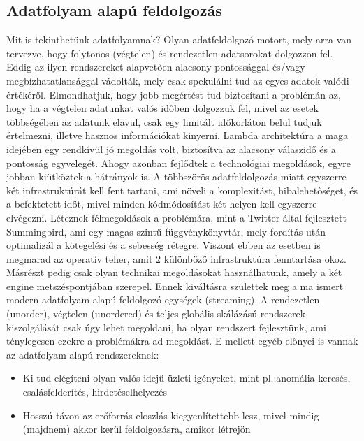 \documentclass[a4paper,12pt]{article}
\begin{document}
\subsection{Adatfolyam alapú feldolgozás}
Mit is tekinthetünk adatfolyamnak? Olyan adatfeldolgozó motort, mely arra van tervezve, hogy folytonos (végtelen) és rendezetlen adatsorokat dolgozzon fel\cite{tyler}. Eddig az ilyen rendszereket alapvetően alacsony pontossággal és/vagy megbízhatatlansággal vádolták, mely csak spekulálni tud az egyes adatok valódi értékéről. Elmondhatjuk, hogy jobb megértést tud biztosítani a problémán az, hogy ha a végtelen adatunkat valós időben dolgozzuk fel, mivel az esetek többségében az adatunk elavul, csak egy limitált időkorláton belül tudjuk értelmezni, illetve hasznos információkat kinyerni. \newline
Lambda architektúra a maga idejében egy rendkívül jó megoldás volt, biztosítva az alacsony válaszidő és a pontosság egyvelegét. Ahogy azonban fejlődtek a technológiai megoldások, egyre jobban kiütköztek a hátrányok is. A többszörös adatfeldolgozás miatt egyszerre két infrastruktúrát kell fent tartani, ami növeli a komplexitást, hibalehetőséget, és a befektetett időt, mivel minden kódmódosítást két helyen kell egyszerre elvégezni. Léteznek félmegoldások a problémára, mint a Twitter által fejlesztett Summingbird\cite{summingbird}, ami egy magas szintű függvénykönyvtár, mely fordítás után optimalizál a kötegelési és a sebesség rétegre. Viszont ebben az esetben is megmarad az operatív teher, amit 2 különböző infrastruktúra fenntartása okoz. Másrészt pedig csak olyan technikai megoldásokat használhatunk, amely a két engine metszéspontjában szerepel. \newline
Ennek kiváltásra születtek meg a ma ismert modern adatfolyam alapú feldolgozó egységek (streaming). A rendezetlen (unorder), végtelen (unordered) és teljes globális skálázású rendszerek kiszolgálását csak úgy lehet megoldani, ha olyan rendszert fejlesztünk, ami ténylegesen ezekre a problémákra ad megoldást.\cite{tyler} E mellett egyéb előnyei is vannak az adatfolyam alapú rendszereknek: 
\begin{itemize}
\item Ki tud elégíteni olyan valós idejű üzleti igényeket, mint pl.:anomália keresés, csalásfelderítés, hirdetéselhelyezés
\item Hosszú távon az erőforrás eloszlás kiegyenlítettebb lesz, mivel mindig (majdnem) akkor kerül feldolgozásra, amikor létrejön
\end{itemize}
\end{document}

